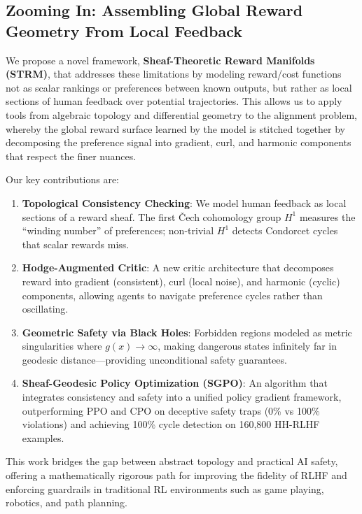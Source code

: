 \subsection{Zooming In: Assembling Global Reward Geometry From Local Feedback}

We propose a novel framework, \textbf{Sheaf-Theoretic Reward Manifolds (STRM)}, that addresses these limitations by modeling reward/cost functions not as scalar rankings or preferences between known outputs, but rather as local sections of human feedback over potential trajectories. This allows us to apply tools from algebraic topology and differential geometry to the alignment problem, whereby the global reward surface learned by the model is stitched together by decomposing the preference signal into gradient, curl, and harmonic components that respect the finer nuances.

Our key contributions are:
\begin{enumerate}
    \item \textbf{Topological Consistency Checking}: We model human feedback as local sections of a reward sheaf. The first \v{C}ech cohomology group $H^1$ measures the ``winding number'' of preferences; non-trivial $H^1$ detects Condorcet cycles that scalar rewards miss.

    \item \textbf{Hodge-Augmented Critic}: A new critic architecture that decomposes reward into gradient (consistent), curl (local noise), and harmonic (cyclic) components, allowing agents to navigate preference cycles rather than oscillating.

    \item \textbf{Geometric Safety via Black Holes}: Forbidden regions modeled as metric singularities where $g(x) \to \infty$, making dangerous states infinitely far in geodesic distance---providing unconditional safety guarantees.

    \item \textbf{Sheaf-Geodesic Policy Optimization (SGPO)}: An algorithm that integrates consistency and safety into a unified policy gradient framework, outperforming PPO \citep{schulman2017proximal} and CPO \citep{achiam2017constrained} on deceptive safety traps (0\% vs 100\% violations) and achieving 100\% cycle detection on 160,800 HH-RLHF examples.
\end{enumerate}

This work bridges the gap between abstract topology and practical AI safety, offering a mathematically rigorous path for improving the fidelity of RLHF and enforcing guardrails in traditional RL environments such as game playing, robotics, and path planning.
